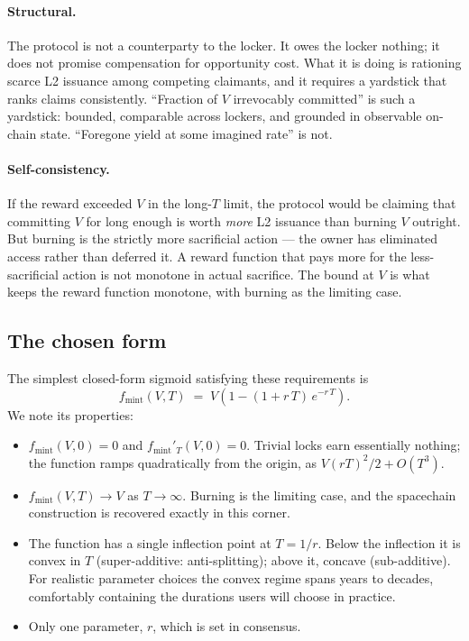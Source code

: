 \documentclass[11pt,a4paper]{article}
\newcommand{\fmint}{f_{\mathrm{mint}}}
\begin{document}
\paragraph{Structural.} The protocol is not a counterparty to the locker. It owes the locker nothing; it does not promise compensation for opportunity cost. What it is doing is rationing scarce L2 issuance among competing claimants, and it requires a yardstick that ranks claims consistently. ``Fraction of $V$ irrevocably committed'' is such a yardstick: bounded, comparable across lockers, and grounded in observable on-chain state. ``Foregone yield at some imagined rate'' is not.

\paragraph{Self-consistency.} If the reward exceeded $V$ in the long-$T$ limit, the protocol would be claiming that committing $V$ for long enough is worth \emph{more} L2 issuance than burning $V$ outright. But burning is the strictly more sacrificial action --- the owner has eliminated access rather than deferred it. A reward function that pays more for the less-sacrificial action is not monotone in actual sacrifice. The bound at $V$ is what keeps the reward function monotone, with burning as the limiting case.

\subsection{The chosen form}

The simplest closed-form sigmoid satisfying these requirements is
\[
\fmint(V, T) \;=\; V\!\left(1 - (1 + r\,T)\,e^{-r\,T}\right).
\]
\noindent We note its properties:
\begin{itemize}[leftmargin=*]
  \item $\fmint(V, 0) = 0$ and $\fmint'_T(V, 0) = 0$. Trivial locks earn essentially nothing; the function ramps quadratically from the origin, as $V(rT)^2/2 + O(T^3)$.
  \item $\fmint(V, T) \to V$ as $T \to \infty$. Burning is the limiting case, and the spacechain construction is recovered exactly in this corner.
  \item The function has a single inflection point at $T = 1/r$. Below the inflection it is convex in $T$ (super-additive: anti-splitting); above it, concave (sub-additive). For realistic parameter choices the convex regime spans years to decades, comfortably containing the durations users will choose in practice.
  \item Only one parameter, $r$, which is set in consensus.
\end{itemize}
\end{document}

